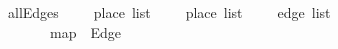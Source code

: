 \isamarkupfalse%
\ allEdges\ {\isacharcolon}{\isacharcolon}\ {\isachardoublequoteopen}{\isacharparenleft}\ \ \ place\ list\ {\isasymRightarrow}\ {\isacharparenleft}\ \ \ place\ list\ {\isasymRightarrow}\ {\isacharparenleft}\ \ \ edge\ list{\isachardoublequoteclose}\isanewline
\ \ \isanewline
\ \ \ \ {\isachardoublequoteopen}\ {\isacharbrackleft}{\isacharbrackright}\ \ {\isacharequal}\ {\isacharbrackleft}{\isacharbrackright}{\isachardoublequoteclose}\isanewline
\ \ {\isacharbar}\ {\isachardoublequoteopen}\ {\isacharparenleft}\ \ {\isacharequal}\ map\ {\isacharparenleft}{\isasymlambda}\ Edge\ \ \ \ {\isacharat}\ \ \ 

